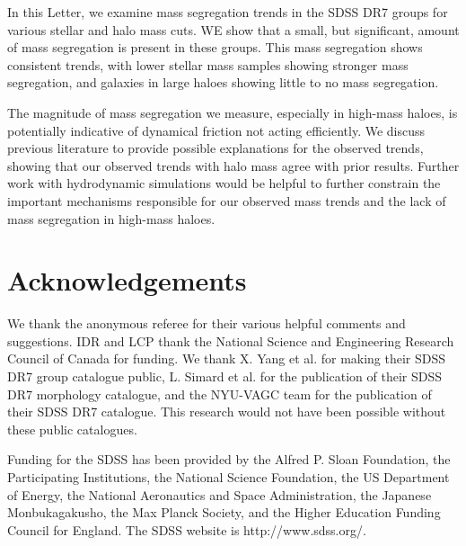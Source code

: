 In this Letter, we examine mass segregation trends in the
\citet{yang2007} SDSS DR7 groups for various stellar and halo mass
cuts.  WE show that a small, but significant, amount of mass
segregation is present in these groups.  This mass segregation shows
consistent trends, with lower stellar mass samples showing stronger
mass segregation, and galaxies in large haloes showing little to no
mass segregation.
\par
The magnitude of mass segregation we measure, especially in high-mass
haloes, is potentially indicative of dynamical friction not acting
efficiently.  We discuss previous literature to provide possible
explanations for the observed trends, showing that our observed trends
with halo mass agree with prior results.  Further work with
hydrodynamic simulations would be helpful to further constrain the
important mechanisms responsible for our observed mass trends and the
lack of mass segregation in high-mass haloes.

\section{Acknowledgements}
\label{acknowledgements_ms}

We thank the anonymous referee for their various helpful comments and
suggestions.  IDR and LCP thank the National Science and Engineering
Research Council of Canada for funding.  We thank X. Yang et al. for
making their SDSS DR7 group catalogue public, L. Simard et al. for the
publication of their SDSS DR7 morphology catalogue, and the NYU-VAGC
team for the publication of their SDSS DR7 catalogue.  This research
would not have been possible without these public catalogues.
\par
Funding for the SDSS has been provided by the Alfred P. Sloan
Foundation, the Participating Institutions, the National Science
Foundation, the US Department of Energy, the National Aeronautics and
Space Administration, the Japanese Monbukagakusho, the Max Planck
Society, and the Higher Education Funding Council for England.  The
SDSS website is http://www.sdss.org/.

%


